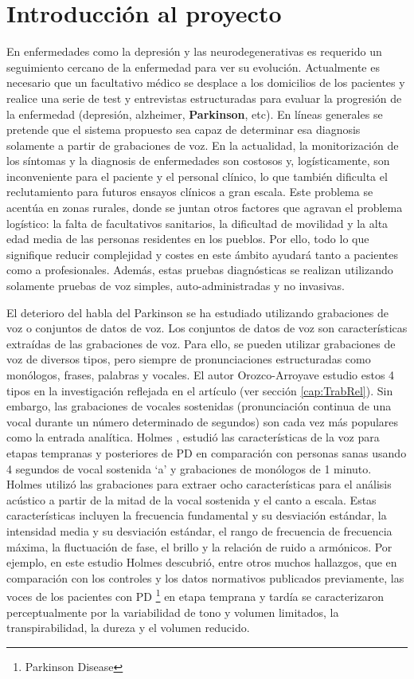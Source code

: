 
\section{Introducción al proyecto}
En enfermedades como la depresión y las neurodegenerativas es requerido un seguimiento cercano de la enfermedad para ver su evolución. Actualmente es necesario que un facultativo médico se desplace a los domicilios de los pacientes y realice una serie de test y entrevistas estructuradas para evaluar la progresión de la enfermedad (depresión, alzheimer, \textbf{Parkinson}, etc). En líneas generales se pretende que el sistema propuesto sea capaz de determinar esa diagnosis solamente a partir de grabaciones de voz. En la actualidad, la monitorización de los síntomas y la diagnosis de enfermedades son costosos y, logísticamente, son inconveniente para el paciente y el personal clínico, lo que también dificulta el reclutamiento para futuros ensayos clínicos a gran escala. Este problema se acentúa en zonas rurales, donde se juntan otros factores que agravan el problema logístico: la falta de facultativos sanitarios, la dificultad de movilidad y la alta edad media de las personas residentes en los pueblos. Por ello, todo lo que signifique reducir complejidad y costes en este ámbito ayudará tanto a pacientes como a profesionales. Además, estas pruebas diagnósticas se realizan utilizando solamente pruebas de voz simples, auto-administradas y no invasivas.

El deterioro del habla del Parkinson se ha estudiado utilizando grabaciones de voz o conjuntos de datos de voz. Los conjuntos de datos de voz son características extraídas de las grabaciones de voz. Para ello, se pueden utilizar grabaciones de voz de diversos tipos, pero siempre de pronunciaciones estructuradas como monólogos, frases, palabras y vocales. El autor Orozco-Arroyave estudio estos 4 tipos en la investigación reflejada en el artículo \cite{Orz2016} (ver sección \ref{cap:TrabRel}). Sin embargo, las grabaciones de vocales sostenidas (pronunciación continua de una vocal durante un número determinado de segundos) son cada vez más populares como la entrada analítica. Holmes \cite{j2000voice}, estudió las características de la voz para etapas tempranas y posteriores de PD en comparación con personas sanas usando 4 segundos de vocal sostenida `a' y grabaciones de monólogos de 1 minuto. 
Holmes utilizó las grabaciones para extraer ocho características para el análisis acústico a partir de la mitad de la vocal sostenida y el canto a escala. Estas características incluyen la frecuencia fundamental y su desviación estándar, la intensidad media y su desviación estándar, el rango de frecuencia de frecuencia máxima, la fluctuación de fase, el brillo y la relación de ruido a armónicos. Por ejemplo, en este estudio Holmes descubrió, entre otros muchos hallazgos, que en comparación con los controles y los datos normativos publicados previamente, las voces de los pacientes con PD \footnote{Parkinson Disease} en etapa temprana y tardía se caracterizaron perceptualmente por la variabilidad de tono y volumen limitados, la transpirabilidad, la dureza y el volumen reducido.

